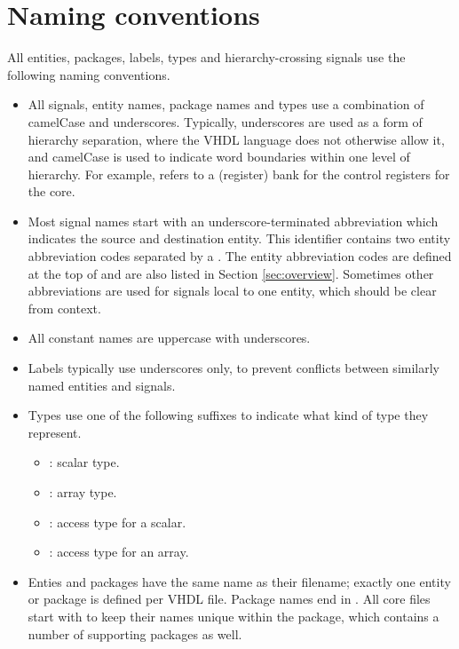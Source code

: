 \documentclass[main.tex]{subfiles}
\begin{document}
\section{Naming conventions}

All entities, packages, labels, types and hierarchy-crossing signals use the following naming conventions.

\begin{itemize}

  \item All signals, entity names, package names and types use a combination of camelCase and underscores. Typically, underscores are used as a form of hierarchy separation, where the VHDL language does not otherwise allow it, and camelCase is used to indicate word boundaries within one level of hierarchy. For example,  refers to a (register) bank for the control registers for the \rvex{} core.
  
  \item Most signal names start with an underscore-terminated abbreviation which indicates the source and destination entity. This identifier contains two entity abbreviation codes separated by a . The entity abbreviation codes are defined at the top of  and are also listed in Section \ref{sec:overview}. Sometimes other abbreviations are used for signals local to one entity, which should be clear from context.
  
  \item All constant names are uppercase with underscores.

  \item Labels typically use underscores only, to prevent conflicts between similarly named entities and signals.

  \item Types use one of the following suffixes to indicate what kind of type they represent.
  \begin{itemize}
    \item {}: scalar type.
    \item {}: array type.
    \item {}: access type for a scalar.
    \item {}: access type for an array.
  \end{itemize}

  \item Enties and packages have the same name as their filename; exactly one entity or package is defined per VHDL file. Package names end in . All \rvex{} core files start with  to keep their names unique within the  package, which contains a number of supporting packages as well.

\end{itemize}
\end{document}
